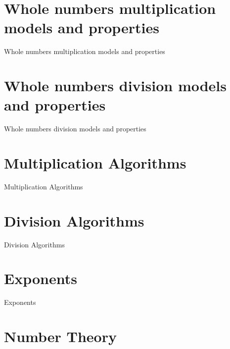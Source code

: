 \section{Whole numbers multiplication models and properties}
\label{sec:whole-numbers-multiplication-models-and-properties}

Whole numbers multiplication models and properties

\section{Whole numbers division models and properties}
\label{sec:whole-numbers-division-models-and-properties}

Whole numbers division models and properties

\section{Multiplication Algorithms}
\label{sec:multiplication-algorithms}

Multiplication Algorithms

\section{Division Algorithms}
\label{sec:division-algorithms}

Division Algorithms

\section{Exponents}
\label{sec:exponents}

Exponents

\section{Number Theory}
\label{sec:number-theory}

